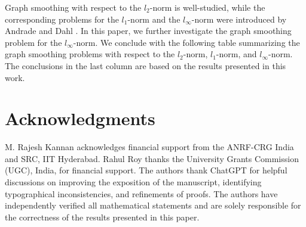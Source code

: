 \documentclass[12pt]{article}
\begin{document}
{{			Graph smoothing with respect to the $l_2$-norm is well-studied, while the corresponding problems for the $l_1$-norm and the $l_\infty$-norm were introduced by Andrade and Dahl \cite{enide-geir-2024}. In this paper, we further investigate the graph smoothing problem for the $l_\infty$-norm.  We conclude with the following table summarizing the graph smoothing problems with respect to the $l_2$-norm, $l_1$-norm, and $l_\infty$-norm. The conclusions in the last column are based on the results presented in this work. 
			
			
			\begin{table}[htbp]
				\centering
				\Large %
				\caption{}
				\label{tab:graph_smoothing}
			\end{table}
			
			
			\section*{Acknowledgments}
			M. Rajesh Kannan acknowledges financial support from the ANRF-CRG India and  SRC, IIT Hyderabad. Rahul Roy thanks the University Grants Commission (UGC), India, for financial support. The authors thank ChatGPT for helpful discussions on improving the exposition of the manuscript, identifying typographical inconsistencies, and refinements of proofs. The authors have independently verified all mathematical statements and are solely responsible for the correctness of the results presented in this paper.
			
}}
\end{document}
